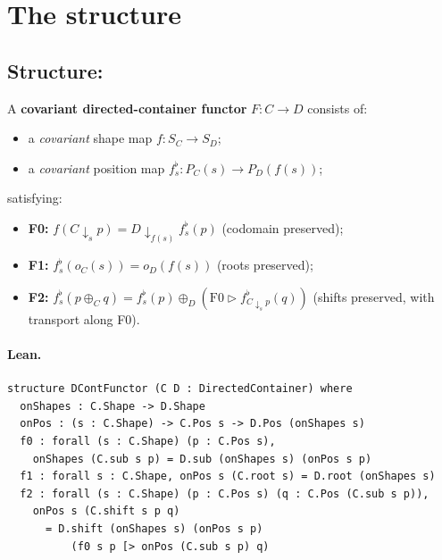 \documentclass[11pt,a4paper]{article}
\begin{document}
\section{The  structure}

\subsection{Structure: }

\begin{defn}
A \textbf{covariant directed-container functor} $F : C \to D$ consists of:
\begin{itemize}
  \item a \emph{covariant} shape map $f : S_C \to S_D$;
  \item a \emph{covariant} position map $f^\flat_s : P_C(s) \to P_D(f(s))$;
\end{itemize}
satisfying:
\begin{itemize}
  \item \textbf{F0:} $f(C \!\downarrow_s\! p) = D \!\downarrow_{f(s)}\! f^\flat_s(p)$
        (codomain preserved);
  \item \textbf{F1:} $f^\flat_s(o_C(s)) = o_D(f(s))$ (roots preserved);
  \item \textbf{F2:} $f^\flat_s(p \oplus_C q) = f^\flat_s(p) \oplus_D
        (\mathrm{F0} \triangleright f^\flat_{C \downarrow_s p}(q))$
        (shifts preserved, with transport along F0).
\end{itemize}
\end{defn}

\paragraph{Lean.}
\begin{lstlisting}[style=lean]
structure DContFunctor (C D : DirectedContainer) where
  onShapes : C.Shape -> D.Shape
  onPos : (s : C.Shape) -> C.Pos s -> D.Pos (onShapes s)
  f0 : forall (s : C.Shape) (p : C.Pos s),
    onShapes (C.sub s p) = D.sub (onShapes s) (onPos s p)
  f1 : forall s : C.Shape, onPos s (C.root s) = D.root (onShapes s)
  f2 : forall (s : C.Shape) (p : C.Pos s) (q : C.Pos (C.sub s p)),
    onPos s (C.shift s p q)
      = D.shift (onShapes s) (onPos s p)
          (f0 s p [> onPos (C.sub s p) q)
\end{lstlisting}
\end{document}
